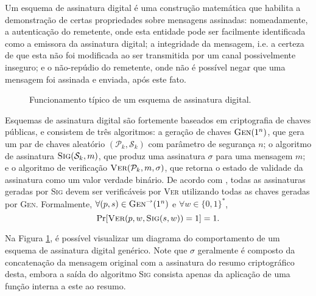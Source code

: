 \documentclass[12pt]{report}
\newcommand{\pk}{$\mathcal{P}_k$}
\newcommand{\sk}{$\mathcal{S}_k$}
\newcommand{\hash}[2][]{\mathcal{H}^{#1}(#2)}
\newcommand{\concat}{\, \vert \vert \,}
\begin{document}
Um esquema de assinatura digital é uma construção matemática que habilita a
demonstração de certas propriedades sobre mensagens assinadas: nomeadamente,
a autenticação do remetente, onde esta entidade pode ser facilmente
identificada como a emissora da assinatura digital; a integridade da mensagem,
i.e. a certeza de que esta não foi modificada ao ser transmitida por um canal
possivelmente inseguro; e o não-repúdio do remetente, onde não é possível negar
que uma mensagem foi assinada e enviada, após este fato.

\begin{figure}[ht]
  \centering
  \caption{Funcionamento típico de um esquema de assinatura digital.}
  \label{fig:2}
\end{figure}

Esquemas de assinatura digital são fortemente baseados em criptografia de
chaves públicas, e consistem de três algoritmos: a geração de chaves
$\textsc{Gen}(1^n)$, que gera um par de chaves aleatório $(\mathcal{P}_k,
\mathcal{S}_k)$ com parâmetro de segurança $n$; o algoritmo de assinatura
$\textsc{Sig}(\mathcal{S}_k, m)$, que produz uma assinatura $\sigma$ para uma
mensagem $m$; e o algoritmo de verificação $\textsc{Ver}(\mathcal{P}_k, m,
\sigma)$, que retorna o estado de validade da assinatura como um valor verdade
binário. De acordo com \cite{Goldreich2004}, todas as assinaturas geradas por
\textsc{Sig} devem ser verificáveis por \textsc{Ver} utilizando todas as chaves
geradas por \textsc{Gen}. Formalmente, $\forall (p, s) \in
\textsc{Gen}^{\rightarrow}(1^n)$ e $\forall w \in \{0, 1\}^{*}$,
\begin{equation}
    \text{Pr}[\textsc{Ver}(p, w, \textsc{Sig}(s, w)) = 1] = 1.
\end{equation}

Na Figura \ref{fig:2}, é possível visualizar um diagrama do comportamento de
um esquema de assinatura digital genérico. Note que $\sigma$ geralmente é
composto da concatenação da mensagem original com a assinatura do resumo
criptográfico desta, embora a saída do algoritmo \textsc{Sig} consista apenas
da aplicação de uma função interna a este ao resumo.



\end{document}
